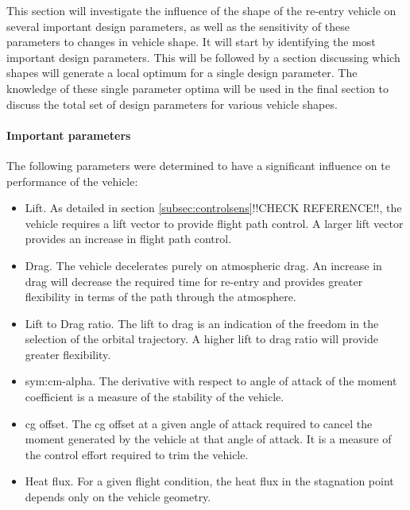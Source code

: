 This section will investigate the influence of the shape of the re-entry vehicle on several important design parameters, as well as the sensitivity of these parameters to changes in vehicle shape. It will start by identifying the most important design parameters. This will be followed by a section discussing which shapes will generate a local optimum for a single design parameter. The knowledge of these single parameter optima will be used in the final section to discuss the total set of design parameters for various vehicle shapes. 


\paragraph{Important parameters}
 The following parameters were determined to have a significant influence on te performance of the vehicle:

\begin{itemize}
	\item{Lift. As detailed in section \ref{subsec:controlsens}!!CHECK REFERENCE!!, the vehicle requires a lift vector to provide flight path control. A larger lift vector provides an increase in flight path control.}
	\item{Drag. The vehicle decelerates purely on atmospheric drag. An increase in drag will decrease the required time for re-entry and provides greater flexibility in terms of the path through the atmosphere. }
	\item{Lift to Drag ratio. The lift to drag is an indication of the freedom in the selection of the orbital trajectory. A higher lift to drag ratio will provide greater flexibility.}
	\item{\gls{sym:cm-alpha}. The derivative with respect to angle of attack of the moment coefficient is a measure of the stability of the vehicle. }
	\item{\gls{cg} offset}. The \gls{cg} offset at a given angle of attack required to cancel the moment generated by the vehicle at that angle of attack. It is a measure of the control effort required to trim the vehicle. 
	\item{Heat flux. For a given flight condition, the heat flux in the stagnation point depends only on the vehicle geometry.  }
\end{itemize}


